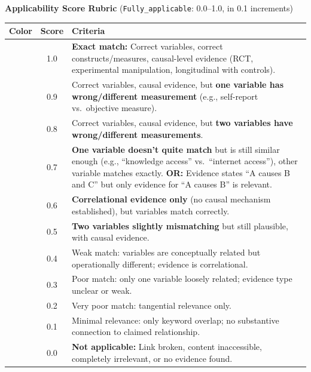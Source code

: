 \begin{table}[H]
\vspace{1em}

\textbf{Applicability Score Rubric} (\texttt{Fully\_applicable}: 0.0--1.0, in 0.1 increments)

\vspace{0.5em}

\begin{tabular}{|>{\columncolor{green!70!black}\color{white}}c|c|p{9cm}|}
\hline
\textbf{Color} & \textbf{Score} & \textbf{Criteria} \\
\hline
\cellcolor{green!70!black}\textcolor{white}{} & 1.0 & \textbf{Exact match:} Correct variables, correct constructs/measures, causal-level evidence (RCT, experimental manipulation, longitudinal with controls). \\
\hline
\cellcolor{green!60} & 0.9 & Correct variables, causal evidence, but \textbf{one variable has wrong/different measurement} (e.g., self-report vs.\ objective measure). \\
\hline
\cellcolor{green!50} & 0.8 & Correct variables, causal evidence, but \textbf{two variables have wrong/different measurements}. \\
\hline
\cellcolor{yellow!70} & 0.7 & \textbf{One variable doesn't quite match} but is still similar enough (e.g., ``knowledge access'' vs.\ ``internet access''), other variable matches exactly. \textbf{OR:} Evidence states ``A causes B and C'' but only evidence for ``A causes B'' is relevant. \\
\hline
\cellcolor{yellow!50} & 0.6 & \textbf{Correlational evidence only} (no causal mechanism established), but variables match correctly. \\
\hline
\cellcolor{orange!50} & 0.5 & \textbf{Two variables slightly mismatching} but still plausible, with causal evidence. \\
\hline
\cellcolor{orange!70} & 0.4 & Weak match: variables are conceptually related but operationally different; evidence is correlational. \\
\hline
\cellcolor{red!50} & 0.3 & Poor match: only one variable loosely related; evidence type unclear or weak. \\
\hline
\cellcolor{red!70} & 0.2 & Very poor match: tangential relevance only. \\
\hline
\cellcolor{red!90}\textcolor{white}{} & 0.1 & Minimal relevance: only keyword overlap; no substantive connection to claimed relationship. \\
\hline
\cellcolor{gray!70} & 0.0 & \textbf{Not applicable:} Link broken, content inaccessible, completely irrelevant, or no evidence found. \\
\hline
\end{tabular}

\end{table}

